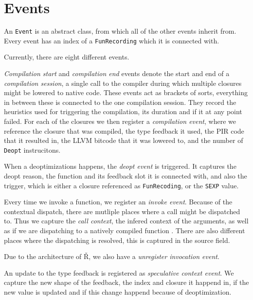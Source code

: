 \section{Events}

An \texttt{Event} is an abstract class, from which all of the other events inherit from. Every event has an index of a \texttt{FunRecording} which it is connected with.

Currently, there are eight different events.

\textit{Compilation start} and \textit{compilation end} events denote the start and end of a \textit{compilation session}, a single call to the compiler during which multiple closures might be lowered to native code. These events act as brackets of sorts, everything in between these is connected to the one compilation session. They record the heuristics used for triggering the compilation, its duration and if it at any point failed. For each of the closures we then register a \textit{compilation event}, where we reference the closure that was compiled, the type feedback it used, the PIR code that it resulted in, the LLVM bitcode that it was lowered to, and the number of \texttt{Deopt} instrucitons.

When a deoptimizations happens, the \textit{deopt event} is triggered. It captures the deopt reason, the function and its feedback slot it is connected with, and also the trigger, which is either a closure referenced as \texttt{FunRecoding}, or the \texttt{SEXP} value.

Every time we invoke a function, we register an \textit{invoke event}. Because of the contextual dispatch, there are mutliple places where a call might be dispatched to. Thus we capture the \textit{call context}, the infered context of the arguments, as well as if we are dispatching to a natively compiled function . There are also different places where the dispatching is resolved, this is captured in the source field.

Due to the architecture of Ř, we also have a \textit{unregister invocation event}. \todoadd

An update to the type feedback is registered as \textit{speculative context event}. We capture the new shape of the feedback, the index and closure it happend in, if the new value is updated and if this change happend because of deoptimization.

